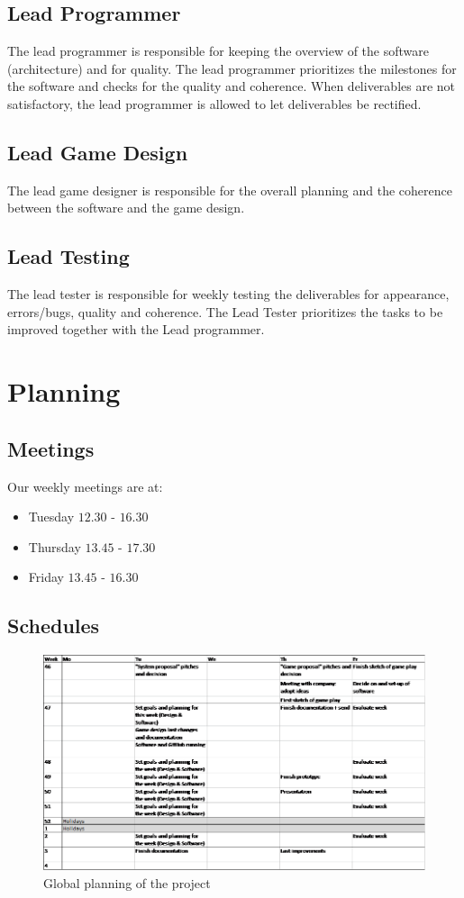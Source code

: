 \documentclass[a4paper,11pt,notitlepage]{report}
\begin{document}
\subsection{Lead Programmer}
The lead programmer is responsible for keeping the overview of the software (architecture) and for quality. The lead programmer prioritizes the milestones for the software and checks for the quality and coherence. When deliverables are not satisfactory, the lead programmer is allowed to let deliverables be rectified.

\subsection{Lead Game Design}
The lead game designer is responsible for the overall planning and the coherence between the software and the game design. 

\subsection{Lead Testing}
The lead tester is responsible for weekly testing the deliverables for appearance, errors/bugs, quality and coherence. The Lead Tester prioritizes the tasks to be improved together with the Lead programmer. 

\section{Planning}

\subsection{Meetings}
Our weekly meetings are at:
\begin{itemize}
	\item Tuesday $12.30$ - $16.30$
	\item Thursday $13.45$ - $17.30$
	\item Friday $13.45$ - $16.30$
\end{itemize}

\subsection{Schedules}

\begin{figure}[H]
	\centering
		\includegraphics[width=1.00\textwidth]{Images/PlanningSmall.png}
	\caption{Global planning of the project}
	\label{fig:Planning}
\end{figure}
\end{document}
